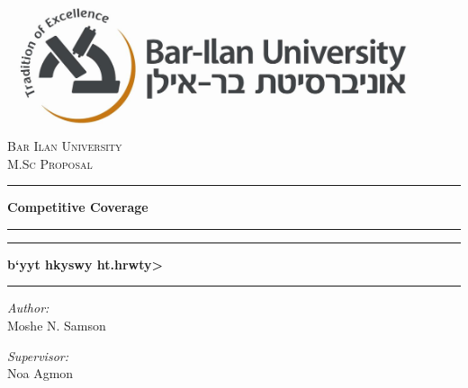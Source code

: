 \documentclass[a4paper,english,10pt]{article}
\begin{document}

\begin{titlepage}
\begin{center}


\includegraphics[width=0.9\textwidth]{Images/logo.jpg}\\[1cm]
\textsc{\LARGE Bar Ilan University}\\[1.5cm]
\textsc{\Large M.Sc Proposal}\\[0.5cm]

\hrule
{ \vspace{2 mm} }
{ \huge \bfseries Competitive Coverage}
{ \vspace{3 mm} }
\hrule
{ \vspace{8 mm} }

\hrule
{ \vspace{2 mm} }

{ \huge \bfseries  \huge \bfseries \<b`yyt hkyswy ht.hrwty> }
{ \vspace{3 mm} }
\hrule
{ \vspace{8 mm} }


\begin{minipage}{0.4\textwidth}
\begin{flushleft} \large
\emph{Author:}\\
Moshe N. Samson 

\end{flushleft}
\end{minipage}
\begin{minipage}{0.4\textwidth}
\begin{flushleft} \large
\emph{Supervisor:} \\
Noa Agmon
\end{flushleft}
\end{minipage}



\end{center}
\end{titlepage}
\end{document}
